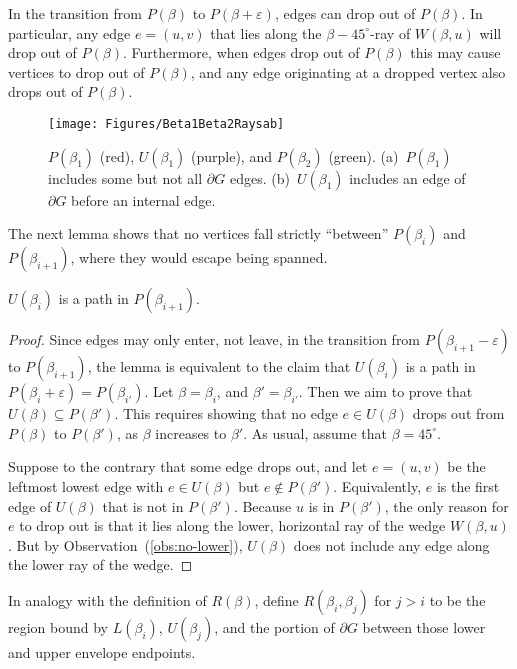 \documentclass{cccg17}
\newcommand{\bluenew}[1]{{#1}}  %
\newcommand{\lemlab}[1]{\label{lemma:#1}}
\newcommand{\figlab}[1]{\label{fig:#1}}
\def\e{{\varepsilon}}
\def\b{{\beta}}
\def\bG{{\partial G}}
\begin{document}
In the transition from $P(\b)$ to $P(\b+\e)$, edges can drop out of $P(\b)$.
In particular, any edge $e=(u,v)$ that lies along the $\b-45^\circ$-ray of 
\bluenew{$W(\b,u)$} will drop out of $P(\b)$.  Furthermore, when edges drop out of $P(\b)$ this may cause vertices to drop out of $P(\b)$, and any edge originating at a dropped vertex also drops out of $P(\b)$. 
\begin{figure}[htbp]
\hspace*{-4mm}%
\centering
\texttt{[image: Figures/Beta1Beta2Raysab]}
\caption{$P(\b_1)$ (red), $U(\b_1)$ (purple), and $P(\b_2)$ (green).
(a)~$P(\b_1)$ includes some but not all $\bG$ edges.
(b)~$U(\b_1)$ includes an edge of $\bG$ before an internal edge.}
\figlab{Beta1Beta2}
\end{figure}

The next lemma shows that no vertices
fall strictly ``between'' $P(\b_i)$ and $P(\b_{i+1})$, 
where they would escape being spanned.


\begin{lemma}
$U(\b_i)$ is a path in $P(\b_{i+1})$.
\lemlab{UbetaShared}
\end{lemma}

\begin{proof}
Since edges may only enter, not leave, in the transition from $P(\b_{i+1}-\e)$ to $P(\b_{i+1})$,
the lemma is equivalent to the claim that  $U(\b_i)$ 
is a path in $P(\b_{i}+\e) = P(\b_{i'})$.
Let $\b=\b_i$, and $\b' = \b_{i'} $.
Then we aim to prove that
$U(\b) \subseteq P(\b')$.
This requires showing \bluenew{that} no edge $e \in U(\b)$ drops out from $P(\b)$ to $P(\b')$,
as $\b$ increases to $\b'$.
As usual, assume that $\b=45^\circ$.

Suppose to the contrary that some edge drops out,
and let $e=(u,v)$ be the leftmost lowest \bluenew{edge} with $e \in U(\b)$ but $e \notin P(\b')$.
Equivalently, $e$ is the first edge of $U(\b)$ that is not in $P(\b')$.
Because $u$ is in $P(\b')$, the only reason for $e$ to drop out is that it
lies along the lower, horizontal ray of the wedge $W(\b,u)$.
But by Observation~(\ref{obs:no-lower}), $U(\b)$ does not include any edge along the lower ray of the wedge.
\end{proof}


In analogy with the definition of $R(\b)$,
define $R(\b_i, \b_j)$ for $j > i$ to be the region bound by 
$L(\b_i)$, $U(\b_j)$, and the portion
of $\bG$ between those lower and upper envelope endpoints.
\end{document}
